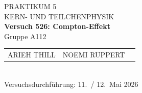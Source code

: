 \documentclass[%
paper=a4,       %
fontsize=11pt,  %
ngerman         %
]{scrreprt}
\begin{document}
\begin{titlepage}
  \centering
  \vspace*{2cm}
  
  {\Large PRAKTIKUM 5}\\[0.5cm]
  {\large KERN- UND TEILCHENPHYSIK }\\[1cm]
  
  {\LARGE\bfseries Versuch 526: Compton-Effekt}\\[1cm]
  
  Gruppe A112\\[1cm]
  
  \begin{tabular}{lll}
    ARIEH THILL & NOEMI RUPPERT  \\
  \end{tabular}\\[2cm]
  
  Versuchsdurchführung: 11.~/ 12.~Mai 2026
  
  \vfill
\end{titlepage}

\tableofcontents
\clearpage
\clearpage
\setcounter{page}{1}


 
 
 
 
 
 
 
 

\appendix
\printbibliography
%
\end{document}
